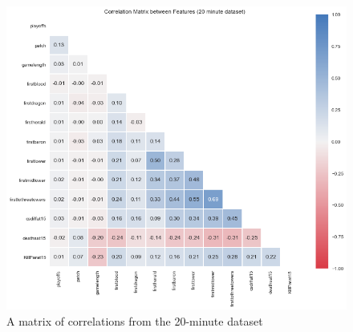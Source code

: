 \begin{figure}[h!]
    \centering
    \includegraphics[width=1\textwidth]{figures/CorrMat20}
    \caption{A matrix of correlations from the 20-minute dataset}
    \label{fig:CorrMat20}
\end{figure}